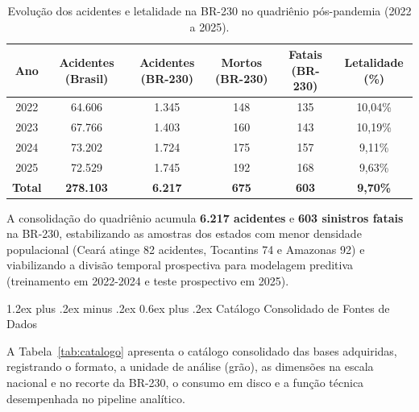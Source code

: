 \documentclass[11pt,a4paper]{article}
\makeatletter
\renewcommand\subsection{
\@startsection{subsection}{2}{0pt}%
{1.2ex plus .2ex minus .2ex}%
{0.6ex plus .2ex}%
{\normalfont\large\bfseries\color{secondary}}
}
\makeatother
\begin{document}
\begin{table}[H]
\centering
\small
\renewcommand{\arraystretch}{1.2}
\caption{Evolução dos acidentes e letalidade na BR-230 no quadriênio pós-pandemia (2022 a 2025).}
\label{tab:pos_pandemia}
\begin{tabularx}{\textwidth}{|c|c|c|c|c|c|}
\hline
\textbf{Ano} & \textbf{Acidentes (Brasil)} & \textbf{Acidentes (BR-230)} & \textbf{Mortos (BR-230)} & \textbf{Fatais (BR-230)} & \textbf{Letalidade (\%)} \\
\hline
2022 & 64.606 & 1.345 & 148 & 135 & 10,04\% \\
\hline
2023 & 67.766 & 1.403 & 160 & 143 & 10,19\% \\
\hline
2024 & 73.202 & 1.724 & 175 & 157 & 9,11\% \\
\hline
2025 & 72.529 & 1.745 & 192 & 168 & 9,63\% \\
\hline
\textbf{Total} & \textbf{278.103} & \textbf{6.217} & \textbf{675} & \textbf{603} & \textbf{9,70\%} \\
\hline
\end{tabularx}
\end{table}

A consolidação do quadriênio acumula \textbf{6.217 acidentes} e \textbf{603 sinistros fatais} na BR-230, estabilizando as amostras dos estados com menor densidade populacional (Ceará atinge 82 acidentes, Tocantins 74 e Amazonas 92) e viabilizando a divisão temporal prospectiva para modelagem preditiva (treinamento em 2022-2024 e teste prospectivo em 2025).

\subsection{Catálogo Consolidado de Fontes de Dados}

A Tabela~\ref{tab:catalogo} apresenta o catálogo consolidado das bases adquiridas, registrando o formato, a unidade de análise (grão), as dimensões na escala nacional e no recorte da BR-230, o consumo em disco e a função técnica desempenhada no pipeline analítico.
\end{document}
